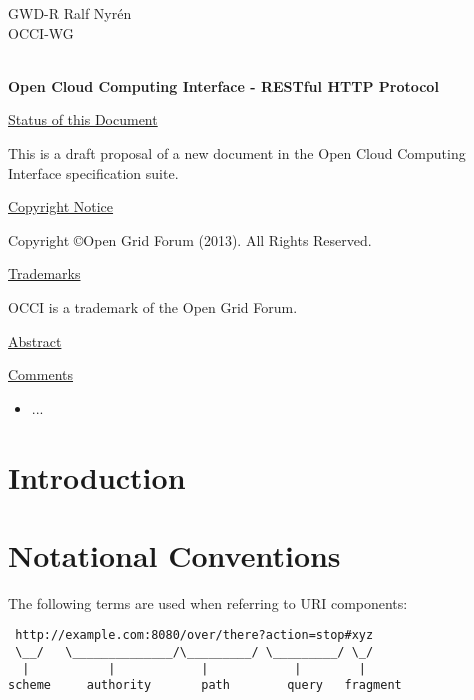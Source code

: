 \documentclass[10pt,a4paper]{article}
\begin{document}
\thispagestyle{empty}

GWD-R \hfill Ralf Nyrén \\
OCCI-WG \\
\\

\vspace*{0.5in}

\begin{Large}
\textbf{Open Cloud Computing Interface - RESTful HTTP Protocol}
\end{Large}

\vspace*{0.5in}

\underline{Status of this Document}

%
This is a draft proposal of a new document in the Open Cloud Computing
Interface specification suite.

\underline{Copyright Notice}

Copyright \copyright Open Grid Forum (2013). All Rights Reserved.

\underline{Trademarks}

OCCI is a trademark of the Open Grid Forum.

\underline{Abstract}



\underline{Comments}
\newcommand{\ralf}[1]{\textcolor{red}{RN: #1}}
\begin{itemize}
\item ...
\end{itemize}

\newpage
\tableofcontents
\newpage

\section{Introduction}
%

\section{Notational Conventions}


The following terms \cite{rfc3986} are used when referring to URI
components:

\begin{verbatim}
 http://example.com:8080/over/there?action=stop#xyz
 \__/   \______________/\_________/ \_________/ \_/
  |           |            |            |        |
scheme     authority       path        query   fragment
\end{verbatim}
\end{document}

